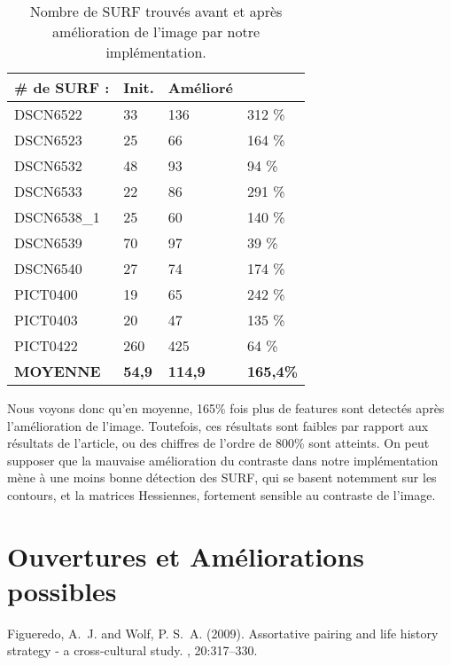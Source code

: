 \documentclass[twoside]{article}
\begin{document}
\begin{multicols}{2}
\begin{table}[H]
    \begin{tabular}{llll}
    \# de SURF : &Init. &Amélioré\\
    \toprule
    DSCN6522     & 33       & 136        & 312 \%     \\
    DSCN6523     & 25       & 66         & 164 \%     \\
    DSCN6532     & 48       & 93         & 94 \%      \\
    DSCN6533     & 22       & 86         & 291 \%     \\
    DSCN6538\_1  & 25       & 60         & 140 \%     \\
    DSCN6539     & 70       & 97         & 39 \%      \\
    DSCN6540     & 27       & 74         & 174 \%     \\
    PICT0400     & 19       & 65         & 242 \%     \\
    PICT0403     & 20       & 47         & 135 \%     \\
    PICT0422     & 260      & 425        & 64 \%      \\
    \toprule
    \textbf{MOYENNE}        & \textbf{54,9}     & \textbf{114,9}   & \textbf{165,4\%}      \\
    \end{tabular}
    \caption{Nombre de SURF trouvés avant et après amélioration de l'image par notre implémentation.}
\end{table}

Nous voyons donc qu'en moyenne, 165\% fois plus de features sont detectés après l'amélioration de l'image. Toutefois, ces résultats sont faibles par rapport aux résultats de l'article, ou des chiffres de l'ordre de 800\% sont atteints. On peut supposer que la mauvaise amélioration du contraste dans notre implémentation mène à une moins bonne détection des SURF, qui se basent notemment sur les contours, et la matrices Hessiennes, fortement sensible au contraste de l'image.


\section{Ouvertures et Améliorations possibles}


\begin{thebibliography}{99} %

Figueredo, A.~J. and Wolf, P. S.~A. (2009).
\newblock Assortative pairing and life history strategy - a cross-cultural
  study.
, 20:317--330.
 
\end{thebibliography}


\end{multicols}
\end{document}
